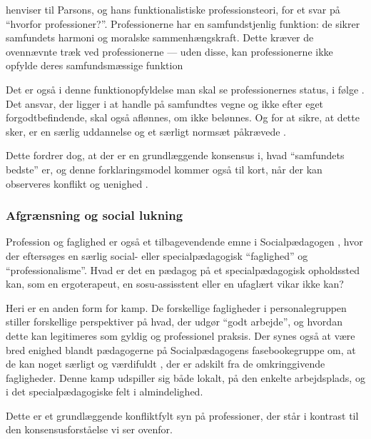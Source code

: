 \citeauthor{frederiksenVelfaerdsprofessionerMellemOmsorg2017} henviser til Parsons, og hans funktionalistiske professionsteori, for et svar på “hvorfor professioner?”.
Professionerne har en samfundstjenlig funktion: de sikrer samfundets harmoni og moralske sammenhængskraft.
Dette kræver de ovennævnte træk ved professionerne --- uden disse, kan professionerne ikke opfylde deres samfundsmæssige funktion \autocite[s. 450]{frederiksenVelfaerdsprofessionerMellemOmsorg2017}

Det er også i denne funktionopfyldelse man skal se professionernes status, i følge \citeauthor{frederiksenVelfaerdsprofessionerMellemOmsorg2017}.
Det ansvar, der ligger i at handle på samfundtes vegne og ikke efter eget forgodtbefindende, skal også aflønnes, om ikke belønnes.
Og for at sikre, at dette sker, er en særlig uddannelse og et særligt normsæt påkrævede \autocite[s. 451]{frederiksenVelfaerdsprofessionerMellemOmsorg2017}.

Dette fordrer dog, at der er en grundlæggende konsensus i, hvad “samfundets bedste” er, og denne forklaringsmodel kommer også til kort, når der kan observeres konflikt og uenighed \autocite{frederiksenVelfaerdsprofessionerMellemOmsorg2017}.

\subsubsection{Afgrænsning og social lukning}

Profession og faglighed er også et tilbagevendende emne i Socialpædagogen \autocite[fx]{petersenHvadSigerEksperten2019}, hvor der eftersøges en særlig social- eller specialpædagogisk “faglighed” og “professionalisme”.
Hvad er det en pædagog på et specialpædagogisk opholdssted kan, som en ergoterapeut, en sosu-assisstent eller en ufaglært vikar ikke kan?

Heri er en anden form for kamp.
De forskellige fagligheder i personalegruppen stiller forskellige perspektiver på hvad, der udgør “godt arbejde”, og hvordan dette kan legitimeres som gyldig og professionel praksis.
Der synes også at være bred enighed blandt pædagogerne på Socialpædagogens fasebookegruppe om, at de kan noget særligt og værdifuldt \autocite{petersenSlagsMenneskeligAltmuligmand2019}, der er adskilt fra de omkringgivende fagligheder.
Denne kamp udspiller sig både lokalt, på den enkelte arbejdsplads, og i det specialpædagogiske felt i almindelighed.

Dette er et grundlæggende konfliktfylt syn på professioner, der står i kontrast til den konsensusforståelse vi ser ovenfor.

